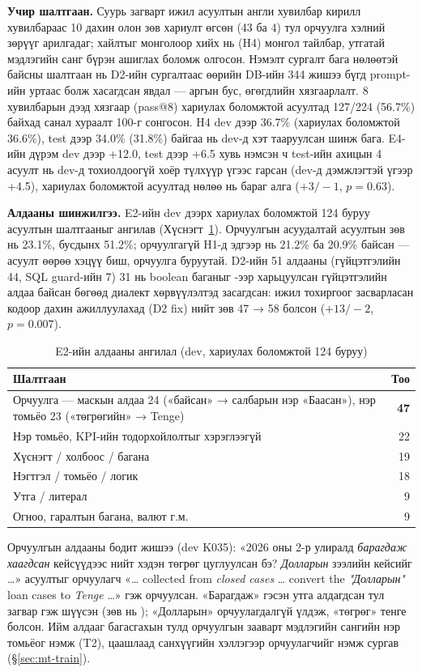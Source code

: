 \textbf{Учир шалтгаан.} Суурь загварт ижил асуултын англи хувилбар кирилл хувилбараас 10 дахин олон зөв хариулт өгсөн
(43 ба 4) тул орчуулга хэлний зөрүүг арилгадаг; хайлтыг монголоор хийх нь (H4) монгол тайлбар, утгатай мэдлэгийн санг
бүрэн ашиглах боломж олгосон. Нэмэлт сургалт бага нөлөөтэй байсны шалтгаан нь D2-ийн сургалтаас өөрийн DB-ийн 344 жишээ
бүгд prompt-ийн уртаас болж хасагдсан явдал --- аргын бус, өгөгдлийн хязгаарлалт. 8 хувилбарын дээд хязгаар (pass@8)
хариулах боломжтой асуултад 127/224 (56.7\%) байхад санал хураалт 100-г сонгосон. H4 dev дээр 36.7\% (хариулах
боломжтой 36.6\%), test дээр 34.0\% (31.8\%) байгаа нь dev-д хэт тааруулсан шинж бага. E4-ийн дүрэм dev дээр +12.0, test
дээр +6.5 хувь нэмсэн ч test-ийн ахицын 4 асуулт нь dev-д тохиолдоогүй хоёр түлхүүр үгээс гарсан (dev-д дэмжлэгтэй үгээр
+4.5), хариулах боломжтой асуултад нөлөө нь бараг алга ($+3/-1$, $p = 0.63$).

\textbf{Алдааны шинжилгээ.}\label{sec:errors} E2-ийн dev дээрх хариулах боломжтой 124 буруу асуултын шалтгааныг ангилав
(Хүснэгт~\ref{tab:errors}). Орчуулгын асуудалтай асуултын зөв нь 23.1\%, бусдынх 51.2\%; орчуулгагүй H1-д эдгээр нь
21.2\% ба 20.9\% байсан --- асуулт өөрөө хэцүү биш, орчуулга буруутай. D2-ийн 51 алдааны (гүйцэтгэлийн 44, SQL guard-ийн
7) 31 нь boolean баганыг -ээр харьцуулсан гүйцэтгэлийн алдаа байсан бөгөөд диалект хөрвүүлэлтэд засагдсан: ижил
тохиргоог засварласан кодоор дахин ажиллуулахад (D2 fix) нийт зөв 47 → 58 болсон ($+13/-2$, $p = 0.007$).

\begin{table}[H]
\centering\small
\caption{E2-ийн алдааны ангилал (dev, хариулах боломжтой 124 буруу)}
\label{tab:errors}
\begin{tabularx}{\textwidth}{X r}
\toprule
Шалтгаан & Тоо \\
\midrule
Орчуулга --- маскын алдаа 24 («байсан» → салбарын нэр «Баасан»), нэр томьёо 23 («төгрөгийн» → Tenge) & \textbf{47} \\
Нэр томьёо, KPI-ийн тодорхойлолтыг хэрэглээгүй & 22 \\
Хүснэгт / холбоос / багана & 19 \\
Нэгтгэл / томьёо / логик & 18 \\
Утга / литерал & 9 \\
Огноо, гаралтын багана, валют г.м. & 9 \\
\bottomrule
\end{tabularx}
\end{table}

Орчуулгын алдааны бодит жишээ (dev K035): «2026 оны 2-р улиралд \emph{барагдаж хаагдсан} кейсүүдээс нийт хэдэн төгрөг
цуглуулсан бэ? \emph{Долларын} зээлийн кейсийг …» асуултыг орчуулагч «… collected from \emph{closed cases} … convert the
\emph{"Долларын"} loan cases to \emph{Tenge} …» гэж орчуулсан. «Барагдаж» гэсэн утга алдагдсан тул загвар
 гэж шүүсэн (зөв нь ); «Долларын» орчуулагдалгүй үлдэж, «төгрөг» тенге болсон. Ийм
алдааг багасгахын тулд орчуулгын зааварт мэдлэгийн сангийн нэр томьёог нэмж (T2), цаашлаад санхүүгийн хэллэгээр
орчуулагчийг нэмж сургав (§\ref{sec:mt-train}).

